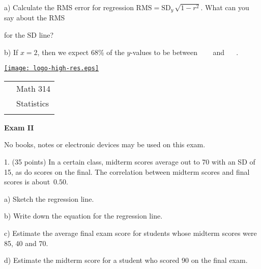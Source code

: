 \documentclass[10pt]{article}
\begin{document}
\hspace{20pt} a) Calculate the RMS error for regression 
$\mbox{RMS}=\mbox{SD}_y\,\sqrt{1-r^2}$.  What can you say about the RMS\vspace{-4pt}

\hspace{20pt}\hphantom{b) } for the SD line?
\vspace{1.6in}

\hspace{20pt} b) If $x=2$, then we expect 68\% of the $y$-values to be
between \ \underline{\hspace{60pt}} \ \ and \  \underline{\hspace{60pt}} \ .

\vfill
\eject

\pagestyle{empty}

\href{http://www.shepherd.edu}{\texttt{[image: logo-high-res.eps]}}
\vspace{-1.69cm}

{\small
\begin{tabular}{cl}
& Math 314\\
& Statistics\\
\hspace{5.28in} & %
\end{tabular}
}

\begin{center}
\textbf{\large  Exam II}
\end{center}
No books, notes or electronic devices may be used on this exam.
\medskip

1. (35 points) In a certain class, midterm scores average out to 70 with an SD of 15, as do 
scores on the final.  The correlation between midterm scores and final scores is 
about~$0.50$.   

\hspace{20pt} a) Sketch the regression line. %
\vspace{1.25in}

\hspace{20pt} b) Write down the equation for the regression line. %
\vspace{1in}

\hspace{20pt} c) 
Estimate the average final exam score for students whose midterm scores were
85, 40 and 70. %
\vspace{2.75in}

\hspace{20pt} d) Estimate the midterm score for a student who scored 90 on the final exam.
\vfill
\eject
{\ }
\end{document}
